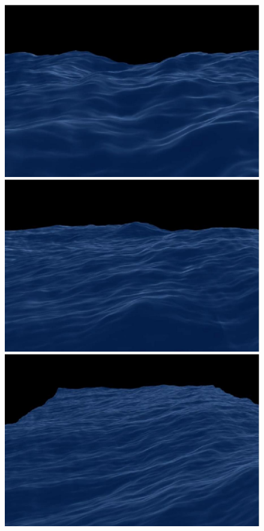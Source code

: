 \begin{figure}
 \centering
 \subtop
 {
  \includegraphics[scale=0.145]{figures/Simulating_Ocean_Water-008.png}
 }
 \hfill
 \subtop
 {
  \includegraphics[scale=0.145]{figures/Simulating_Ocean_Water-009.png}
 }
 \hfill
 \subtop
 {
  \includegraphics[scale=0.145]{figures/Simulating_Ocean_Water-010.png}
 }
\end{figure}